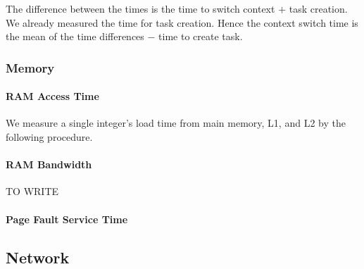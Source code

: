 \documentclass{article}
\begin{document}
The difference between the times is the time to switch context $+$ task creation.
We already measured the time for task creation. Hence the context switch time is the mean of the time differences $-$ time to create task.  

\subsubsection{Memory}
\paragraph{RAM Access Time}

We measure a single integer's load time from main memory, L1, and L2 by the following procedure.


\paragraph{RAM Bandwidth}

TO WRITE

\paragraph{Page Fault Service Time}


\subsection{Network}
\end{document}
